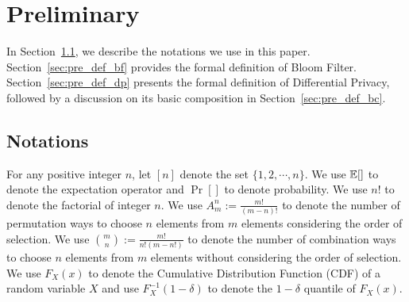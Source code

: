 
\section{Preliminary}\label{sec:preliminary}
In Section~\ref{sec:pre_notations}, we describe the notations we use in this paper. 
Section~\ref{sec:pre_def_bf} provides the formal definition of Bloom Filter.
Section~\ref{sec:pre_def_dp} presents the formal definition of Differential Privacy, followed by a discussion on its basic composition in Section~\ref{sec:pre_def_bc}. 

\subsection{Notations}\label{sec:pre_notations}

For any positive integer $n$, let $[n]$ denote the set $\{1, 2, \cdots , n\}$. We use $\operatorname*{{\mathbb{E}}}[]$ to denote the expectation operator and $\Pr[]$ to denote probability. We use $n!$ to denote the factorial of integer $n$. We use $A_{m}^{n}:=\frac{m!}{(m-n)!}$ to denote the number of permutation ways to choose $n$ elements from $m$ elements considering the order of selection. We use $\binom{m}{n}:=\frac{m!}{n!(m-n!)}$ to denote the number of combination ways to choose $n$ elements from $m$ elements without considering the order of selection. We use $F_{X}(x)$ to denote the Cumulative Distribution Function (CDF) of a random variable $X$ and use $F_{X}^{-1}(1-\delta)$ to denote the $1-\delta$ quantile of $F_{X}(x)$.


